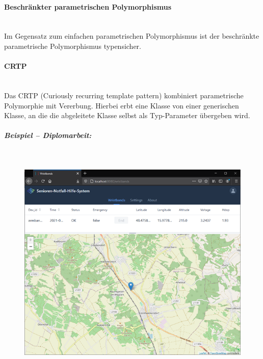 			\paragraph{Beschränkter parametrischen Polymorphismus}\mbox{}\\
				Im Gegensatz zum einfachen parametrischen Polymorphismus ist der beschränkte parametrische Polymorphismus
				typensicher.
				
			\paragraph{CRTP}\mbox{}\\
				Das CRTP (Curiously recurring template pattern) kombiniert parametrische Polymorphie mit Vererbung. Hierbei
				erbt eine Klasse von einer generischen Klasse, an die die abgeleitete Klasse selbst als Typ-Parameter übergeben
				wird.
				
				\UseRawInputEncoding{}
				
				\subparagraph{Beispiel -- Diplomarbeit:}\mbox{}\\
				
					\begin{figure}[H]
						\includegraphics[width=\textwidth]{polymorphie/universell/parametrisch/crtp/beispiele/diplomarbeit/applikationsserver.png}
					\end{figure}
					
